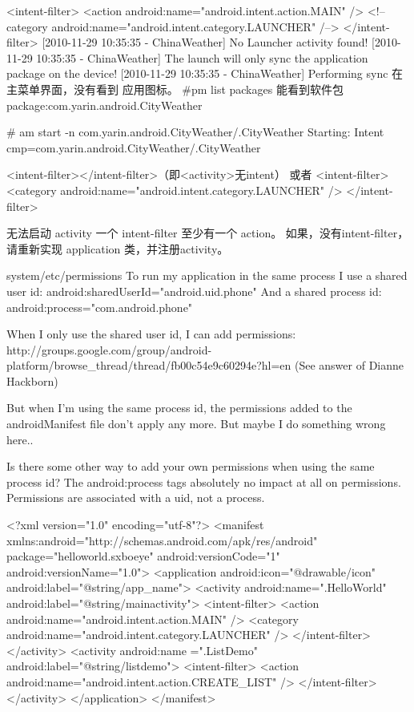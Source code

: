 \documentclass{book}
\begin{document}
\begin{CJK}{UTF8}{gbsn}
{            <intent-filter>
                <action android:name="android.intent.action.MAIN" />
                <!-- category android:name="android.intent.category.LAUNCHER" /-->
            </intent-filter>
[2010-11-29 10:35:35 - ChinaWeather] No Launcher activity found!
[2010-11-29 10:35:35 - ChinaWeather] The launch will only sync the application package on the device!
[2010-11-29 10:35:35 - ChinaWeather] Performing sync
在主菜单界面，没有看到 应用图标。
#pm list packages 
能看到软件包
package:com.yarin.android.CityWeather 

# am start -n com.yarin.android.CityWeather/.CityWeather 
Starting: Intent { cmp=com.yarin.android.CityWeather/.CityWeather } 


  	<intent-filter></intent-filter>（即<activity>无intent）
或者
  	<intent-filter>
                <category android:name="android.intent.category.LAUNCHER" />
        </intent-filter>

无法启动 activity
一个 intent-filter 至少有一个 action。  如果，没有intent-filter，请重新实现  application 类，并注册activity。


system/etc/permissions
To run my application in the same process I use a shared user id:
android:sharedUserId="android.uid.phone"
And a shared process id:
android:process="com.android.phone"

When I only use the shared user id, I can add permissions:
http://groups.google.com/group/android-platform/browse_thread/thread/fb00c54e9c60294e?hl=en
(See answer of Dianne Hackborn)

But when I'm using the same process id, the permissions added to the
androidManifest file don't apply any more. But maybe I do something
wrong here..

Is there some other way to add your own permissions when using the
same process id?
The android:process tags absolutely no impact at all on permissions.  Permissions are associated with a uid, not a process.





<?xml version="1.0" encoding="utf-8"?> 
<manifest xmlns:android="http://schemas.android.com/apk/res/android" 
      package="helloworld.sxboeye" android:versionCode="1" android:versionName="1.0"> 
    <application android:icon="@drawable/icon" android:label="@string/app_name"> 
        <activity android:name=".HelloWorld" android:label="@string/mainactivity"> 
            <intent-filter> 
                <action android:name="android.intent.action.MAIN" /> 
                <category android:name="android.intent.category.LAUNCHER" /> 
            </intent-filter> 
        </activity> 
        <activity android:name =".ListDemo" android:label="@string/listdemo"> 
            <intent-filter> 
                <action android:name="android.intent.action.CREATE_LIST" /> 
            </intent-filter> 
        </activity> 
    </application> 
</manifest> 

}
\end{CJK}
\end{document}
